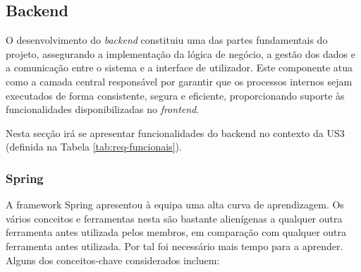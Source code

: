\subsection{Backend}

O desenvolvimento do \textit{backend} constituiu uma das partes fundamentais do projeto, assegurando a implementação da lógica de negócio, a gestão dos dados e a comunicação entre o sistema e a interface de utilizador. Este componente atua como a camada central responsável por garantir que os processos internos sejam executados de forma consistente, segura e eficiente, proporcionando suporte às funcionalidades disponibilizadas no \textit{frontend}.  

Nesta secção irá se apresentar funcionalidades do backend no contexto da US3 (definida na Tabela \ref{tab:req-funcionais}).







\subsubsection{Spring}
\label{sec:backend-Spring}

A framework Spring apresentou à equipa uma alta curva de aprendizagem. Os vários conceitos e ferramentas nesta são bastante alienígenas a qualquer outra ferramenta antes utilizada pelos membros, em comparação com qualquer outra ferramenta antes utilizada. Por tal foi necessário mais tempo para a aprender. Alguns dos conceitos-chave considerados incluem:

